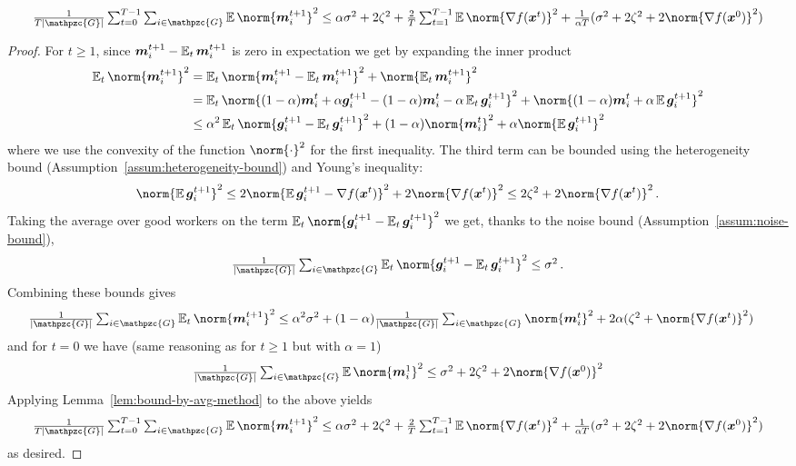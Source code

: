 \documentclass{article}
\newcommand{\gset}{\ensuremath{{\mathpzc{G}}}}
\begin{document}
\begin{lemma}\label{lem:momentum-bound}

  \[
    \tfrac{1}{T|\gset|} \tsum_{t=0}^{T-1} \tsum_{i\in\gset} \E \norm{\mm_i^{t+1}}^2 
     \le
    \alpha \sigma^2 + 2\zeta^2 + \tfrac{2}{T} \tsum_{t=1}^{T-1} \E \norm{\nabla f(\xx^t)}^2 
    + \tfrac{1}{\alpha T}(\sigma^2 + 2 \zeta^2 + 2\norm{\nabla f(\xx^0)}^2)
  \]
  
\end{lemma}

\begin{proof}
  For $t \ge 1$, since $\bm{m}_i^{t+1} - \operatorname{\operatorname{\mathbb{E}}}_t \bm{m}_i^{t+1}$ is zero in expectation we get by expanding the inner product
  \begin{align*}
    \E_t \norm{\mm_i^{t+1}}^2 
     &=
    \E_t \norm{\mm_i^{t+1} - \E_t \mm_i^{t+1}}^2 + \norm{\E_t \mm_i^{t+1}}^2 
    \\
     &=
    \E_t \norm{(1-\alpha)\mm_i^t + \alpha \gg_i^{t+1} - (1-\alpha)\mm_i^t - \alpha \E_t \gg_i^{t+1}}^2 + \norm{(1-\alpha)\mm_i^t + \alpha \E \gg_i^{t+1}}^2 
    \\
     &\le
    \alpha^2 \E_t \norm{ \gg_i^{t+1} - \E_t \gg_i^{t+1}}^2 + (1-\alpha)\norm{\mm_i^t}^2 + \alpha \norm{\E \gg_i^{t+1}}^2 
  \end{align*}
  where we use the convexity of the function $\norm{\cdot}^2$ for the first inequality. The third term can be bounded using the heterogeneity bound (Assumption~\ref{assum:heterogeneity-bound}) and Young's inequality:
  \[
    \norm{\E \gg_i^{t+1}}^2
     \le 
    2\norm{\E \gg_i^{t+1} - \nabla f(\xx^t)}^2
    + 2\norm{\nabla f(\xx^t)}^2
     \le 
    2\zeta^2 + 2\norm{\nabla f(\xx^t)}^2 \, .
  \]
  Taking the average over good workers on the term $\E_t \norm{ \gg_i^{t+1} - \E_t \gg_i^{t+1}}^2$ we get, thanks to the noise bound (Assumption~\ref{assum:noise-bound}),
  \[
    \tfrac{1}{|\gset|} \tsum_{i\in\gset} \E_t \norm{ \gg_i^{t+1} - \E_t \gg_i^{t+1}}^2
     \le 
    \sigma^2 \, .
  \]
  Combining these bounds gives
  \begin{align*}
    \tfrac{1}{|\gset|} \tsum_{i\in\gset} \E_t \norm{\mm_i^{t+1}}^2 
     &\le
    \alpha^2 \sigma^2 + (1-\alpha) \tfrac{1}{|\gset|} \tsum_{i\in\gset} \norm{\mm_i^t}^2 + 2\alpha(\zeta^2 + \norm{\nabla f(\xx^t)}^2)
  \end{align*}
  and for $t=0$ we have (same reasoning as for $t\ge 1$ but with $\alpha=1$)
  \begin{align*}
    \tfrac{1}{|\gset|} \tsum_{i\in\gset} \E \norm{\mm_i^1}^2 
     \le 
    \sigma^2 + 2 \zeta^2 + 2\norm{\nabla f(\xx^0)}^2
  \end{align*}
  Applying Lemma~\ref{lem:bound-by-avg-method} to the above yields
  \[
    \tfrac{1}{T|\gset|} \tsum_{t=0}^{T-1} \tsum_{i\in\gset} \E \norm{\mm_i^{t+1}}^2 
     \le
    \alpha \sigma^2 + 2\zeta^2 + \tfrac{2}{T} \tsum_{t=1}^{T-1} \E \norm{\nabla f(\xx^t)}^2 
    + \tfrac{1}{\alpha T}(\sigma^2 + 2 \zeta^2 + 2\norm{\nabla f(\xx^0)}^2)
  \]
  as desired.
\end{proof}
\end{document}

